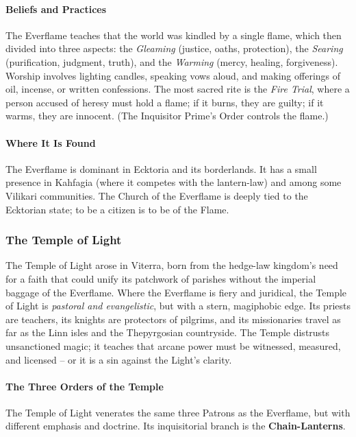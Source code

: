\paragraph{Beliefs and Practices}
The Everflame teaches that the world was kindled by a single flame, which then divided into three aspects: the \textit{Gleaming} (justice, oaths, protection), the \textit{Searing} (purification, judgment, truth), and the \textit{Warming} (mercy, healing, forgiveness). Worship involves lighting candles, speaking vows aloud, and making offerings of oil, incense, or written confessions. The most sacred rite is the \textit{Fire Trial}, where a person accused of heresy must hold a flame; if it burns, they are guilty; if it warms, they are innocent. (The Inquisitor Prime's Order controls the flame.)

\paragraph{Where It Is Found}
The Everflame is dominant in Ecktoria and its borderlands. It has a small presence in Kahfagia (where it competes with the lantern-law) and among some Vilikari communities. The Church of the Everflame is deeply tied to the Ecktorian state; to be a citizen is to be of the Flame.

\subsubsection{The Temple of Light}
\label{sec:temple-of-light}

The Temple of Light arose in Viterra, born from the hedge-law kingdom's need for a faith that could unify its patchwork of parishes without the imperial baggage of the Everflame. Where the Everflame is fiery and juridical, the Temple of Light is \textit{pastoral and evangelistic}, but with a stern, magiphobic edge. Its priests are teachers, its knights are protectors of pilgrims, and its missionaries travel as far as the Linn isles and the Thepyrgosian countryside. The Temple distrusts unsanctioned magic; it teaches that arcane power must be witnessed, measured, and licensed -- or it is a sin against the Light's clarity.

\paragraph{The Three Orders of the Temple}
The Temple of Light venerates the same three Patrons as the Everflame, but with different emphasis and doctrine. Its inquisitorial branch is the \textbf{Chain-Lanterns}.

